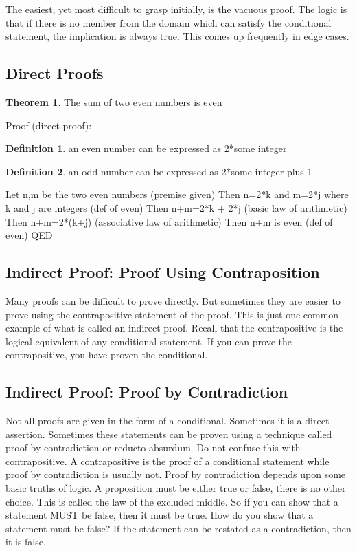 \documentclass[11pt]{book} %
\theoremstyle {definition}
\newtheorem {definition}{Definition}[section]
\newtheorem {theorem}{Theorem}[section]
\theoremstyle {remark}
\begin{document}
The easiest, yet most difficult to grasp initially, is the vacuous proof. The logic is that if there is no member from the domain which can satisfy the conditional statement, the implication is always true. This comes up frequently in edge cases.
 
\subsection {Direct Proofs}
\begin {theorem}
The sum of two even numbers is even
\end {theorem}
Proof (direct proof):

\begin {definition}
an even number can be expressed as 2*some integer
\end {definition}

\begin {definition}
an odd number can be expressed as 2*some integer plus 1
\end {definition}

Let n,m be the two even numbers (premise given)
Then n=2*k and m=2*j where k and j are integers (def of even)
Then n+m=2*k + 2*j (basic law of arithmetic)
Then n+m=2*(k+j) (associative law of arithmetic)
Then n+m is even (def of even)    QED

\subsection {Indirect Proof: Proof Using Contraposition}
Many proofs can be difficult to prove directly. But sometimes they are easier to prove using the contrapositive statement of the proof. This is just one common example of what is called an indirect proof. Recall that the contrapositive is the logical equivalent of any conditional statement. If you can prove the contrapositive, you have proven the conditional.

\subsection {Indirect Proof: Proof by Contradiction}
Not all proofs are given in the form of a conditional. Sometimes it is a direct assertion. Sometimes these statements can be proven using a technique called proof by contradiction or reducto absurdum. Do not confuse this with contrapositive. A contrapositive is the proof of a conditional statement while proof by contradiction is usually not. Proof by contradiction depends upon some basic truths of logic. A proposition must be either true or false, there is no other choice. This is called the law of the excluded middle. So if you can show that a statement MUST be false, then it must be true. How do you show that a statement must be false? If the statement can be restated as a contradiction, then it is false. 
\end{document}
